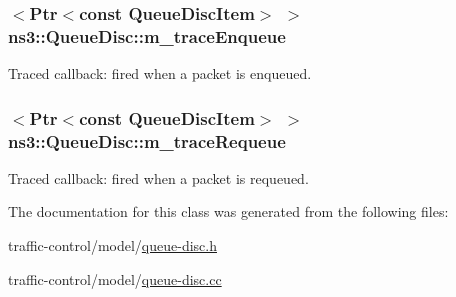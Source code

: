 \subsubsection[{\texorpdfstring{m\+\_\+trace\+Enqueue}{m_traceEnqueue}}]{$<${\bf Ptr}$<$const {\bf Queue\+Disc\+Item}$>$ $>$ ns3\+::\+Queue\+Disc\+::m\+\_\+trace\+Enqueue\hspace{0.3cm}{\ttfamily [private]}}\hypertarget{classns3_1_1QueueDisc_a7614788f662bc6df8c98a646f494dd61}{}\label{classns3_1_1QueueDisc_a7614788f662bc6df8c98a646f494dd61}


Traced callback\+: fired when a packet is enqueued. 

\subsubsection[{\texorpdfstring{m\+\_\+trace\+Requeue}{m_traceRequeue}}]{$<${\bf Ptr}$<$const {\bf Queue\+Disc\+Item}$>$ $>$ ns3\+::\+Queue\+Disc\+::m\+\_\+trace\+Requeue\hspace{0.3cm}{\ttfamily [private]}}\hypertarget{classns3_1_1QueueDisc_a599ba8331f01a8b7ff1d690a8c52dedc}{}\label{classns3_1_1QueueDisc_a599ba8331f01a8b7ff1d690a8c52dedc}


Traced callback\+: fired when a packet is requeued. 



The documentation for this class was generated from the following files\+:\begin{DoxyCompactItemize}
\item 
traffic-\/control/model/\hyperlink{queue-disc_8h}{queue-\/disc.\+h}\item 
traffic-\/control/model/\hyperlink{queue-disc_8cc}{queue-\/disc.\+cc}\end{DoxyCompactItemize}
